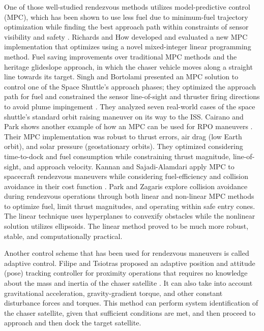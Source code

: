 \documentclass[letterpaper, preprint, paper,11pt]{AAS}	%
\begin{document}
One of those well-studied rendezvous methods utilizes model-predictive control (MPC), which has been shown to use less fuel due to minimum-fuel trajectory optimization while finding the best approach path within constraints of sensor visibility and safety \cite{RichardsHow_PerformanceMPC}. Richards and How developed and evaluated a new MPC implementation that optimizes using a novel mixed-integer linear programming method. Fuel saving improvements over traditional MPC methods and the heritage glideslope approach, in which the chaser vehicle
moves along a straight line towards its target. Singh and Bortolami presented an MPC solution to control one of the Space Shuttle's approach phases; they optimized the approach path for fuel and constrained the sensor line-of-sight and thruster firing directions to avoid plume impingement \cite{SinghBortolami_OptimalMPC}. They analyzed seven real-world cases of the space shuttle's standard orbit raising maneuver on its way to the ISS. Cairano and Park shows another example of how an MPC can be used for RPO maneuvers \cite{CairanoPark_MPCRPO}. Their MPC implementation was robust to thrust errors, air drag (low Earth orbit), and solar pressure (geostationary orbits). They optimized considering time-to-dock and fuel consumption while constraining thrust magnitude, line-of-sight, and approach velocity. Kannan and Sajadi-Alamdari apply MPC to spacecraft rendezvous maneuvers while considering fuel-efficiency and collision avoidance in their cost function \cite{KannanAlamdari_MPC}. Park and Zagaris explore collision avoidance during rendezvous operations through both linear and non-linear MPC methods to optimize fuel, limit thrust magnitudes, and operating within safe entry cones. The linear technique uses hyperplanes to convexify obstacles while the nonlinear solution utilizes ellipsoids. The linear method proved to be much more robust, stable, and computationally practical.

Another control scheme that has been used for rendezvous maneuvers is called adaptive control. Filipe and Tsiotras proposed an adaptive position and attitude (pose) tracking controller for proximity operations that requires no knowledge about the mass and inertia of the chaser satellite \cite{FilipeTsiotras_AdaptiveDualQ}. It can also take into account gravitational acceleration, gravity-gradient torque, and other constant disturbance forces and torques. This method can perform system identification of the chaser satellite, given that sufficient conditions are met, and then proceed to approach and then dock the target satellite. 
\end{document}
